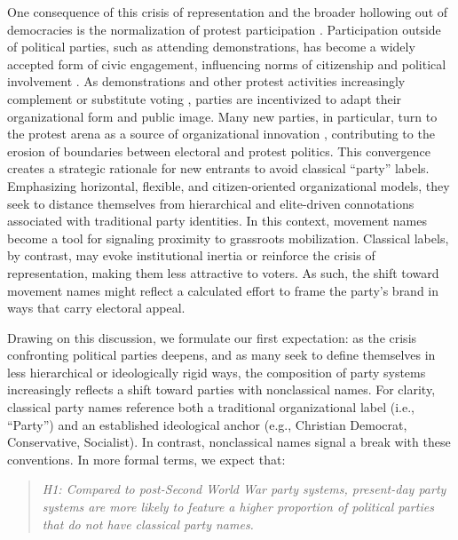 \documentclass[12pt]{article}
\begin{document}
One consequence of this crisis of representation and the broader hollowing out of democracies \citep{Berman_2021, Mair_2013} is the normalization of protest participation \citep{Meyer_Tarrow_1998, giugni_grasso_2019a}. Participation outside of political parties, such as attending demonstrations, has become a widely accepted form of civic engagement, influencing norms of citizenship and political involvement \citep{Dalton_2008b}. As demonstrations and other protest activities increasingly complement or substitute voting \citep{oser2022protest, rojon2025comparing}, parties are incentivized to adapt their organizational form and public image. Many new parties, in particular, turn to the protest arena as a source of organizational innovation \citep{della_Porta_et_al_2017, Tarrow_2021, Castelli_Gattinara_Pirro_2024}, contributing to the erosion of boundaries between electoral and protest politics. This convergence creates a strategic rationale for new entrants to avoid classical “party” labels. Emphasizing horizontal, flexible, and citizen-oriented organizational models, they seek to distance themselves from hierarchical and elite-driven connotations associated with traditional party identities. In this context, movement names become a tool for signaling proximity to grassroots mobilization. Classical labels, by contrast, may evoke institutional inertia or reinforce the crisis of representation, making them less attractive to voters. As such, the shift toward movement names might reflect a calculated effort to frame the party's brand in ways that carry electoral appeal.

Drawing on this discussion, we formulate our first expectation: as the crisis confronting political parties deepens, and as many seek to define themselves in less hierarchical or ideologically rigid ways, the composition of party systems increasingly reflects a shift toward parties with nonclassical names. For clarity, classical party names reference both a traditional organizational label (i.e., “Party”) and an established ideological anchor (e.g., Christian Democrat, Conservative, Socialist). In contrast, nonclassical names signal a break with these conventions. In more formal terms, we expect that:

\begin{quote}
\textit{H1: Compared to post-Second World War party systems, present-day party systems are more likely to feature a higher proportion of political parties that do not have classical party names.}
\label{hyp:party_system}
\end{quote}
\end{document}
